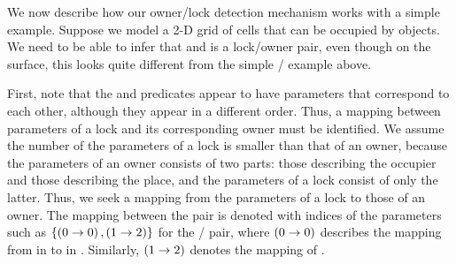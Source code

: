 We now describe how our %
owner/lock detection mechanism works
with a simple example.
Suppose we model a 2-D grid 
of cells that can be occupied by objects.  We need to
be able to infer that  and
 is a lock/owner pair, even though on
the surface, this looks quite different from the simple / example above.

First, note that the  and  predicates
appear to have parameters that correspond to each other, although
they appear in a different order.
Thus, a mapping between parameters of a lock and its corresponding owner must be identified.
We assume the number of the parameters of a lock is smaller than that of an owner,
because the parameters of an owner consists of two parts:
those describing the occupier and those describing the place,
and the parameters of a lock consist of only the latter.
Thus, we seek a mapping from the parameters of a lock to those of an owner.
The mapping between the pair is denoted with indices of the parameters such as
$\left\{\left(0 \rightarrow 0\right),\left(1 \rightarrow 2\right)\right\}$ for the / pair,
where $\left(0 \rightarrow 0\right)$ describes the mapping from  in 
 to  in .
Similarly, $\left(1 \rightarrow 2\right)$ denotes the mapping of .




